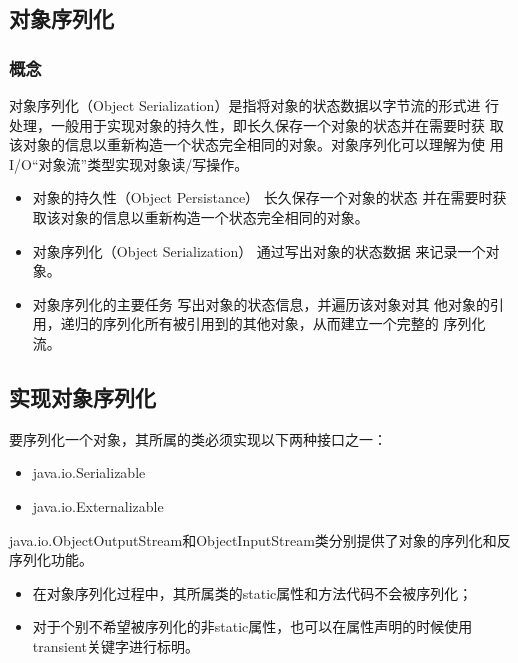 \subsection{对象序列化}

\subsubsection{概念}

对象序列化（Object Serialization）是指将对象的状态数据以字节流的形式进
行处理，一般用于实现对象的持久性，即长久保存一个对象的状态并在需要时获
取该对象的信息以重新构造一个状态完全相同的对象。对象序列化可以理解为使
用I/O“对象流”类型实现对象读/写操作。

\begin{itemize}\kai
\item {\hei 对象的持久性（Object Persistance）} 长久保存一个对象的状态
  并在需要时获取该对象的信息以重新构造一个状态完全相同的对象。
\item {\hei 对象序列化（Object Serialization）} 通过写出对象的状态数据
  来记录一个对象。
\item {\hei 对象序列化的主要任务} 写出对象的状态信息，并遍历该对象对其
  他对象的引用，递归的序列化所有被引用到的其他对象，从而建立一个完整的
  序列化流。
\end{itemize}

\subsection{实现对象序列化}

要序列化一个对象，其所属的类必须实现以下两种接口之一：

\begin{itemize}
\item java.io.Serializable
\item java.io.Externalizable
\end{itemize}

java.io.ObjectOutputStream和ObjectInputStream类分别提供了对象的序列化和反序列化功能。


\begin{itemize}\kai
\item 在对象序列化过程中，其所属类的static属性和方法代码不会被序列化；
\item 对于个别不希望被序列化的非static属性，也可以在属性声明的时候使用transient关键字进行标明。
\end{itemize}



